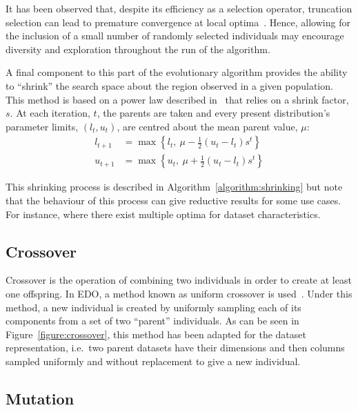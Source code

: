 It has been observed that, despite its efficiency as a selection operator,
truncation selection can lead to premature convergence at local
optima~\cite{Jebari2013, Tatsuya2002}. Hence, allowing for the inclusion of a
small number of randomly selected individuals may encourage diversity and
exploration throughout the run of the algorithm.

A final component to this part of the evolutionary algorithm provides the
ability to ``shrink'' the search space about the region observed in a given
population. This method is based on a power law described
in~\cite{Amirjanov2016} that relies on a shrink factor, \(s\). At each
iteration, \(t\), the parents are taken and every present distribution's
parameter limits, \(\left(l_t, u_t\right)\), are centred about the mean parent
value, \(\mu\):
\begin{align}
    \label{eq:shrinking_lower}
    l_{t+1}&= \max \left\{l_t, \ \mu - \frac{1}{2} (u_t - l_t) s^t\right\}\\
    \label{eq:shrinking_upper}
    u_{t+1}&= \max \left\{u_t, \ \mu + \frac{1}{2} (u_t - l_t) s^t\right\}
\end{align}

This shrinking process is described in Algorithm~\ref{algorithm:shrinking} but
note that the behaviour of this process can give reductive results for some use
cases. For instance, where there exist multiple optima for dataset
characteristics.



\subsection{Crossover}

Crossover is the operation of combining two individuals in order to create at
least one offspring. In EDO, a method known as uniform crossover is
used~\cite{Semenkin2012}. Under this method, a new individual is created by
uniformly sampling each of its
components from a set of two ``parent'' individuals. As can be seen in
Figure~\ref{figure:crossover}, this method has been adapted for the dataset
representation, i.e.\ two parent datasets have their dimensions and then columns
sampled uniformly and without replacement to give a new individual.



\subsection{Mutation}


